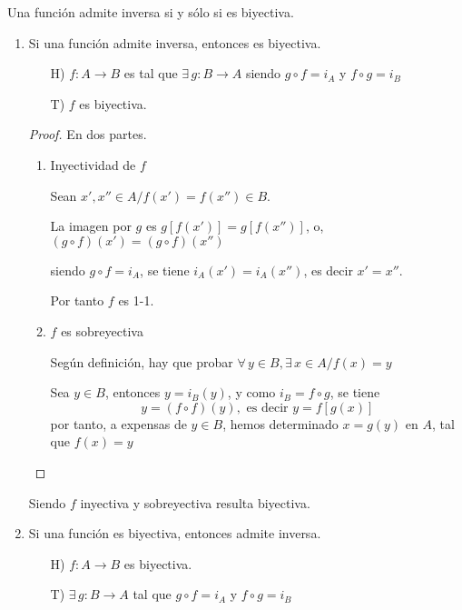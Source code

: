 \begin{fmd-theorem}
	Una función admite inversa si y sólo si es biyectiva.
\end{fmd-theorem}

\begin{enumerate}
	\item Si una función admite inversa, entonces es biyectiva.
	\begin{itemize}
		\item[H)] $f: A\rightarrow B$ es tal que $\exists \, g: B \rightarrow A$
		siendo $g \circ f = i_A$ y $f \circ g = i_B$
		\item[T)] $f$ es biyectiva.
	\end{itemize}
	\begin{proof}
		En dos partes.
		\begin{enumerate}[label=\alph*)]
			\item Inyectividad de $f$
			
			Sean $x', x'' \in A / f(x') = f(x'') \in B$.
			
			La imagen por $g$ es $g[f(x')] = g[f(x'')] $, o,
			$(g \circ f)(x') = (g \circ f)(x'')$
			
			siendo $g \circ f = i_A$, se tiene $i_A(x') = i_A(x'')$, es decir
			$x' = x''$.
			
			Por tanto $f$ es 1-1.

		\item $f$ es sobreyectiva
		
		Según definición, hay que probar $\forall \, y \in B, \exists \, x \in A /
		f(x) = y$\vspace{2mm}
		
		Sea $y \in B$, entonces $y = i_B(y)$, y como $i_B = f \circ g$, se tiene
		\[ y = (f \circ f)(y), \mbox{ es decir } y= f[g(x)] \]
		por tanto, a expensas de $y \in B$, hemos determinado $x = g(y)$ en $A$,
		tal que $f(x) = y$
	\end{enumerate}
\end{proof}
Siendo $f$ inyectiva y sobreyectiva resulta biyectiva.


	\item Si una función es biyectiva, entonces admite inversa.
	
	\begin{itemize}
		\item[H)] $f: A \rightarrow B$ es biyectiva.
		\item[T)] $\exists \, g: B \rightarrow A$ tal que $g \circ f = i_A$ y
		$f \circ g = i_B$
	\end{itemize}
	

\end{enumerate}
